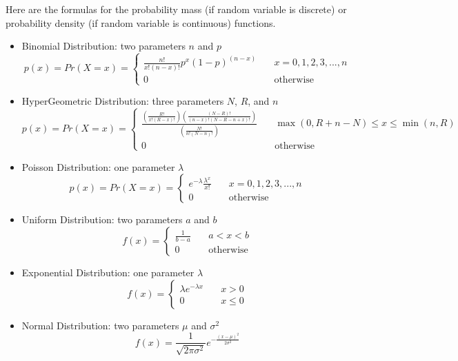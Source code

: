 \documentclass{article}
\begin{document}
Here are the formulas for the probability mass (if random variable is discrete) or probability density (if random variable is continuous) functions.
\begin{itemize}
\item Binomial Distribution: two parameters $n$ and $p$\\
$$
p(x) = Pr(X = x) = \left\{
        \begin{array}{ll}
            \frac{n!}{x!(n-x)!}p^x(1-p)^{(n-x)} & \quad x = 0, 1, 2, 3, ... , n \\
            0 & \quad \text{otherwise}
        \end{array}
    \right.
$$
\item HyperGeometric Distribution: three parameters $N$, $R$, and $n$\\
$$
p(x) = Pr(X = x) = \left\{
        \begin{array}{ll}
            \frac{\left(\frac{R!}{x!(R-x)!}\right) \left(\frac{(N-R)!}{(n-x)!(N-R-n+x)!}\right)}{\left(\frac{N!}{n!(N-n)!}\right)}& \quad \max(0,R+n-N) \leq x \leq \min(n,R) \\
            0 & \quad \text{otherwise}
        \end{array}
    \right.
$$
\item Poisson Distribution: one parameter $\lambda$\\
$$
p(x) = Pr(X = x) = \left\{
        \begin{array}{ll}
            e^{-\lambda}\frac{\lambda^x}{x!} & \quad x = 0, 1, 2, 3, ... , n \\
            0 & \quad \text{otherwise}
        \end{array}
    \right.
$$
\item Uniform Distribution: two parameters $a$ and $b$\\
$$
f(x) = \left\{
        \begin{array}{ll}
            \frac{1}{b-a} & \quad a < x < b \\
            0 & \quad \text{otherwise}
        \end{array}
    \right.
$$
\item Exponential Distribution: one parameter $\lambda$\\
$$
f(x) = \left\{
        \begin{array}{ll}
            \lambda e^{-\lambda x} & \quad x > 0 \\
            0 & \quad x \leq 0
        \end{array}
    \right.
$$
\item Normal Distribution: two parameters $\mu$ and $\sigma^2$\\
$$
f(x) = \frac{1}{\sqrt{2\pi\sigma^2}}e^{-\frac{(x-\mu)^2}{2\sigma^2}}
$$
\end{itemize}
\end{document}
